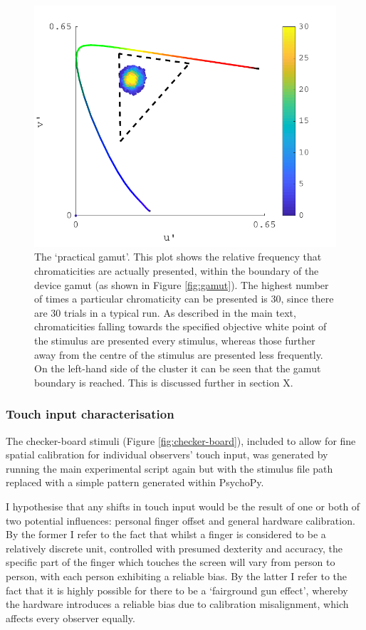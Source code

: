 \begin{figure}[hbtp]
\includegraphics[max width=\textwidth]{figs/tablet/practical_gamut.pdf}
\caption{The `practical gamut'. This plot shows the relative frequency that chromaticities are actually presented, within the boundary of the device gamut (as shown in Figure \ref{fig:gamut}). The highest number of times a particular chromaticity can be presented is 30, since there are 30 trials in a typical run. As described in the main text, chromaticities falling towards the specified objective white point of the stimulus are presented every stimulus, whereas those further away from the centre of the stimulus are presented less frequently. On the left-hand side of the cluster it can be seen that the gamut boundary is reached. This is discussed further in section X. %
}
\label{fig:practical}
\end{figure}


\subsubsection{Touch input characterisation} \label{sec:touch}
The checker-board stimuli (Figure \ref{fig:checker-board}), included to allow for fine spatial calibration for individual observers' touch input, was generated by running the main experimental script again but with the stimulus file path replaced with a simple pattern generated within PsychoPy.

I hypothesise that any shifts in touch input would be the result of one or both of two potential influences: personal finger offset and general hardware calibration. By the former I refer to the fact that whilst a finger is considered to be a relatively discrete unit, controlled with presumed dexterity and accuracy, the specific part of the finger which touches the screen will vary from person to person, with each person exhibiting a reliable bias. By the latter I refer to the fact that it is highly possible for there to be a `fairground gun effect', whereby the hardware introduces a reliable bias due to calibration misalignment, which affects every observer equally.

